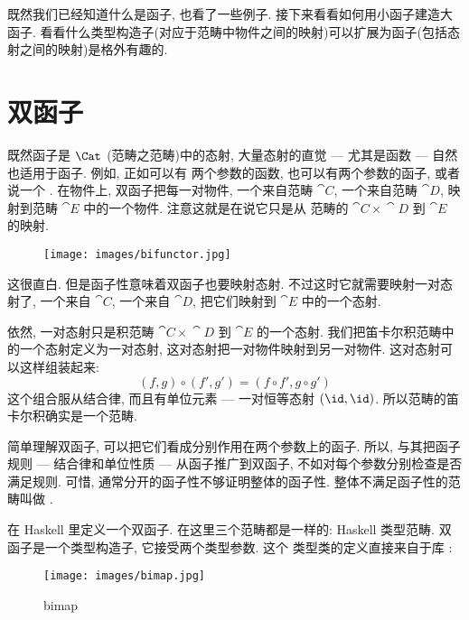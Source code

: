 
\lettrine[lhang=0.17]{既}{然}我们已经知道什么是函子, 也看了一些例子. 接下来看看如何用小函子建造大函子.
看看什么类型构造子(对应于范畴中物件之间的映射)可以扩展为函子(包括态射之间的映射)是格外有趣的.

\section{双函子}

既然函子是 $\Cat$ (范畴之范畴)中的态射, 大量态射的直觉 --- 尤其是函数 --- 自然也适用于函子. 例如, 正如可以有
两个参数的函数, 也可以有两个参数的函子, 或者说一个 . 在物件上, 双函子把每一对物件,
一个来自范畴 $\cat{C}$, 一个来自范畴 $\cat{D}$, 映射到范畴 $\cat{E}$ 中的一个物件. 注意这就是在说它只是从
范畴的 $\cat{C}\times{}\cat{D}$ 到 $\cat{E}$ 的映射.

\begin{figure}[H]
  \centering\texttt{[image: images/bifunctor.jpg]}
\end{figure}

\noindent
这很直白. 但是函子性意味着双函子也要映射态射. 不过这时它就需要映射一对态射了, 一个来自 $\cat{C}$, 一个来自
$\cat{D}$, 把它们映射到 $\cat{E}$ 中的一个态射.

依然, 一对态射只是积范畴 $\cat{C}\times{}\cat{D}$ 到 $\cat{E}$ 的一个态射. 我们把笛卡尔积范畴中的一个态射定义为一对态射,
这对态射把一对物件映射到另一对物件. 这对态射可以这样组装起来:
\[(f, g) \circ (f', g') = (f \circ f', g \circ g')\]
这个组合服从结合律, 而且有单位元素 --- 一对恒等态射 $(\id, \id)$. 所以范畴的笛卡尔积确实是一个范畴.

简单理解双函子, 可以把它们看成分别作用在两个参数上的函子. 所以, 与其把函子规则 --- 结合律和单位性质 --- 从函子推广到双函子,
不如对每个参数分别检查是否满足规则. 可惜, 通常分开的函子性不够证明整体的函子性. 整体不满足函子性的范畴叫做 .

在 Haskell 里定义一个双函子. 在这里三个范畴都是一样的: Haskell 类型范畴. 双函子是一个类型构造子, 它接受两个类型参数.
这个  类型类的定义直接来自于库 :


\begin{figure}[H]
  \centering\texttt{[image: images/bimap.jpg]}
  \caption{bimap}
\end{figure}


